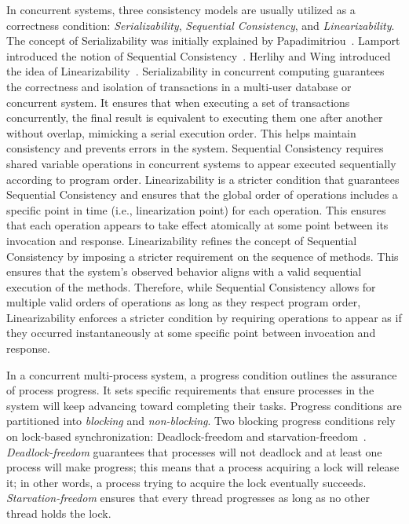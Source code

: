 In concurrent systems, three consistency models are usually utilized as a correctness condition: \textit{Serializability}, \textit{Sequential Consistency}, and \textit{Linearizability}. The concept of Serializability was initially explained by Papadimitriou~\cite{DBLP_journals_jacm_Papadimitriou79b}. Lamport introduced the notion of Sequential Consistency~\cite{lamport1979how}. Herlihy and Wing introduced the idea of Linearizability~\cite{DBLP_journals_toplas_HerlihyW90DBLP_journals_toplas_HerlihyW90}.
Serializability in concurrent computing guarantees the correctness and isolation of transactions in a multi-user database or concurrent system. It ensures that when executing a set of transactions concurrently, the final result is equivalent to executing them one after another without overlap, mimicking a serial execution order. This helps maintain consistency and prevents errors in the system. 
Sequential Consistency requires shared variable operations in concurrent systems to appear executed sequentially according to program order. Linearizability is a stricter condition that guarantees Sequential Consistency and ensures that the global order of operations includes a specific point in time (i.e., linearization point) for each operation. This ensures that each operation appears to take effect atomically at some point between its invocation and response. Linearizability refines the concept of Sequential Consistency by imposing a stricter requirement on the sequence of methods. This ensures that the system's observed behavior aligns with a valid sequential execution of the methods. Therefore, while Sequential Consistency allows for multiple valid orders of operations as long as they respect program order, Linearizability enforces a stricter condition by requiring operations to appear as if they occurred instantaneously at some specific point between invocation and response. 

In a concurrent multi-process system, a progress condition outlines the assurance of process progress. It sets specific requirements that ensure processes in the system will keep advancing toward completing their tasks. Progress conditions are partitioned into \textit{blocking} and \textit{non-blocking}. Two blocking progress conditions rely on lock-based synchronization: Deadlock-freedom and starvation-freedom~\cite{DBLP_books_daglib_0020056}. \textit{Deadlock-freedom} guarantees that processes will not deadlock and at least one process will make progress; this means that a process acquiring a lock will release it; in other words, a process trying to acquire the lock eventually succeeds. \textit{Starvation-freedom} ensures that every thread progresses as long as no other thread holds the lock.

